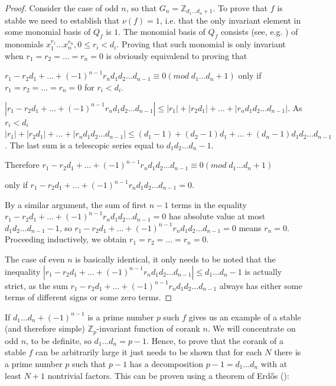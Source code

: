 \documentclass{amsart}
\begin{document}
\begin{proof}

Consider the case of odd $n$, so that $G_n= \mathbb{Z}_{d_1\ldots d_n + 1}$. To prove that $f$ is stable we need to establish that $\nu(f)=1$, i.e. that the only invariant element in some monomial basis of $Q_f$ is $1$. The monomial basis of $Q_f$ consists (see, e.g. \cite{10}) of monomials $x_1^{r_1}\ldots x_n^{r_n}, 0 \leq r_i < d_i$. Proving that such monomial is only invariant when $r_1 = r_2 = \ldots = r_n =0$ is obviously equivalend to proving that 

$r_1 - r_2 d_1 + \ldots + (-1)^{n-1} r_n d_1 d_2 \ldots d_{n-1} \equiv 0 (mod \; d_1\ldots d_n + 1)$ only if $r_1 = r_2 = \ldots = r_n =0$ for $r_i < d_i$.


 $| r_1 - r_2 d_1 + \ldots + (-1)^{n-1}  r_n d_1 d_2 \ldots d_{n-1} | \leq | r_1| + |r_2 d_1| + \ldots + | r_n d_1 d_2 \ldots d_{n-1} |$. As $r_i < d_i$  $| r_1| + |r_2 d_1| + \ldots + | r_n d_1 d_2 \ldots d_{n-1} | \leq (d_1-1) + (d_2-1)d_1 + \ldots + (d_n - 1) d_1 d_2 \ldots d_{n-1}$. The last sum is a telescopic series equal to $d_1 d_2 \ldots d_n - 1$. 
 
 Therefore $r_1 - r_2 d_1 + \ldots + (-1)^{n-1}  r_n d_1 d_2 \ldots d_{n-1} \equiv 0 (mod \; d_1\ldots d_n + 1)$ 
 
 only if $r_1 - r_2 d_1 + \ldots + (-1)^{n-1}  r_n d_1 d_2 \ldots d_{n-1} = 0$. 
 
 By a similar argument, the sum of first $n-1$ terms in the equality $r_1 - r_2 d_1 + \ldots + (-1)^{n-1}  r_n d_1 d_2 \ldots d_{n-1} = 0$ has absolute value at most $d_1 d_2 \ldots d_{n-1} - 1$, so $r_1 - r_2 d_1 + \ldots + (-1)^{n-1}  r_n d_1 d_2 \ldots d_{n-1} = 0$ means $r_n=0$. Proceeding inductively, we obtain $r_1 = r_2 = \ldots = r_n =0$. 
 
 The case of even $n$ is basically identical, it only needs to be noted that the inequality  $| r_1 - r_2 d_1 + \ldots + (-1)^{n-1}  r_n d_1 d_2 \ldots d_{n-1} | \leq d_1 \ldots d_n -1$ is actually strict, as the sum $r_1 - r_2 d_1 + \ldots + (-1)^{n-1}  r_n d_1 d_2 \ldots d_{n-1}$ always has either some terms of different signs or some zero terms.
\end{proof}


If $d_1\ldots d_n + (-1)^{n-1}$ is a prime number $p$ such $f$ gives us an example of a stable (and therefore simple) $\mathbb{Z}_p$-invariant function of corank $n$. We will concentrate on odd $n$, to be definite, so $d_1 \ldots d_n = p-1$. Hence, to prove that the corank of a stable $f$ can be arbitrarily large it just needs to be shown that for each $N$ there is a prime number $p$ such that $p-1$ has a decomposition $p-1=d_1 \ldots d_n$ with at least $N+1$ nontrivial factors. This can be proven using a theorem of Erd\H{o}s (\cite{12}):
 
\end{document}
